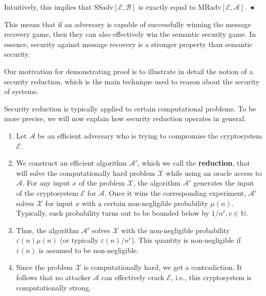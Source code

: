 \documentclass[../lecture-notes-148x210.tex]{subfiles}
\begin{document}
Intuitively, this implies that $\text{SSadv}[\mathcal{E}, \mathcal{B}]$ is exactly equal 
to $\text{MRadv}[\mathcal{E}, \mathcal{A}]$.~$\blacktriangleleft$

This means that if an adversary is capable of successfully winning the 
message recovery game, then they can also effectively win the semantic security game.
In essence, security against message recovery is a stronger property than
semantic security. 

Our motivation for demonstrating proof is to illustrate in detail the notion of a security
reduction, which is the main technique used to reason about the security of systems.

Security reduction is typically applied to certain computational problems. To be more precise, 
we will now explain how security reduction operates in general.
\begin{definition} 
    \hfill
    \begin{enumerate}
        \item Let $\mathcal{A}$ be an efficient adversary who is trying to
        compromise the cryptosystem $\mathcal{E}$.
        \item We construct an efficient algorithm $\mathcal{A}'$, which we call the
        \textbf{reduction}, that will solve the computationally hard problem
        $\mathcal{X}$ while using an oracle access to $\mathcal{A}$. For any
        input $x$ of the problem $\mathcal{X}$, the algorithm $\mathcal{A}'$
        generates the input of the cryptosystem $\mathcal{E}$ for $\mathcal{A}$.
        Once it wins the corresponding experiment, $\mathcal{A}'$ solves
        $\mathcal{X}$ for input $x$ with a certain non-negligible probability
        $\mu(n)$. Typically, such probability turns out to be bounded below by
        $1/n^c, c \in \mathbb{N}$.
        \item Thus, the algorithm $\mathcal{A}'$ solves $\mathcal{X}$ with the
        non-negligible probability $\varepsilon(n)\mu(n)$ (or typically
        $\varepsilon(n)/n^c$). This quantity is non-negligible 
        if $\varepsilon(n)$ is assumed to be non-negligible.
        \item Since the problem $\mathcal{X}$ is computationally hard, we get a
        contradiction. It follows that no attacker $\mathcal{A}$ can effectively
        crack $\mathcal{E}$, i.e., this cryptosystem is computationally strong.
    \end{enumerate}
\end{definition}
\end{document}
